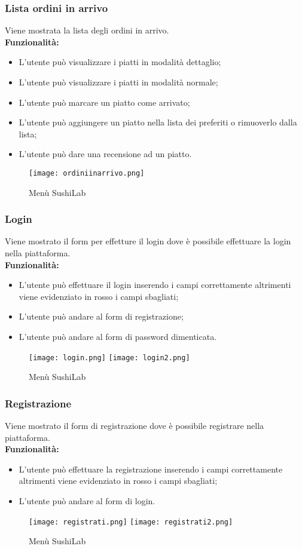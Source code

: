 \subsubsection{Lista ordini in arrivo}
Viene mostrata la lista degli ordini in arrivo.\\
\textbf{Funzionalità:}
\begin{itemize}
    \item L'utente può visualizzare i piatti in modalità dettaglio;
    \item L'utente può visualizzare i piatti in modalità normale;
    \item L'utente può marcare un piatto come arrivato;
    \item L'utente può aggiungere un piatto nella lista dei preferiti o rimuoverlo dalla lista;
    \item L'utente può dare una recensione ad un piatto.
\end{itemize}
\begin{figure}[H]
    \centering
    \texttt{[image: ordiniinarrivo.png]}
    \caption{Menù SushiLab}
\end{figure}
\subsubsection{Login}
Viene mostrato il form per effetture il login dove è possibile effettuare la login nella piattaforma.\\
\textbf{Funzionalità:}
\begin{itemize}
    \item L'utente può effettuare il login inserendo i campi correttamente altrimenti viene evidenziato in rosso i campi sbagliati;
    \item L'utente può andare al form di registrazione;
    \item L'utente può andare al form di password dimenticata.
\end{itemize}
\begin{figure}[H]
    \centering
    \texttt{[image: login.png]}
    \texttt{[image: login2.png]}
    \caption{Menù SushiLab}
\end{figure}
\subsubsection{Registrazione}
Viene mostrato il form di registrazione dove è possibile registrare nella piattaforma.\\
\textbf{Funzionalità:}
\begin{itemize}
    \item L'utente può effettuare la registrazione inserendo i campi correttamente altrimenti viene evidenziato in rosso i campi sbagliati;
    \item L'utente può andare al form di login.
\end{itemize}
\begin{figure}[H]
    \centering
    \texttt{[image: registrati.png]}
    \texttt{[image: registrati2.png]}
    \caption{Menù SushiLab}
\end{figure}

